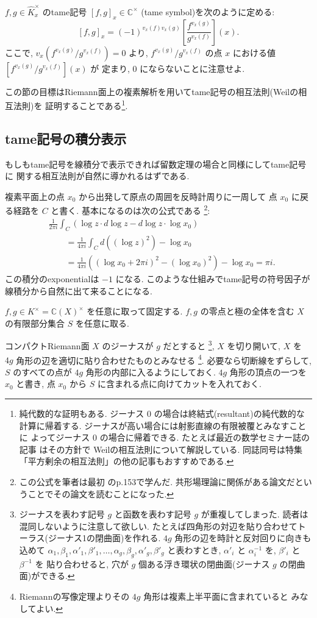 \documentclass[12pt,twoside]{jarticle}
\newcommand\C{{\mathbb C}} %
\theoremstyle{definition} %
\theoremstyle{definition} %
\theoremstyle{definition} %
\numberwithin{theorem}{section}
\numberwithin{equation}{section}
\numberwithin{figure}{section}
\numberwithin{table}{section}
\newcommand\Khat{{\widehat K}}
\newcommand\tame[3]{\left[#2,#3\right]_{#1}}
\begin{document}
$f,g\in\Khat_x^\times$ のtame記号 $\tame{x}{f}{g}\in\C^\times$ 
(tame symbol)を次のように定める:
\[
\tame{x}{f}{g} =
(-1)^{v_x(f)v_x(g)}\left[\frac{f^{v_x(g)}}{g^{v_x(f)}}\right](x).
\]
ここで, $v_x(f^{v_x(g)}/g^{v_x(f)})=0$ より, 
$f^{v_x(g)}/g^{v_x(f)}$ の点 $x$ における値 $[f^{v_x(g)}/g^{v_x(f)}](x)$ が
定まり, $0$ にならないことに注意せよ.

この節の目標はRiemann面上の複素解析を用いてtame記号の相互法則(Weilの相互法則)を
証明することである\footnote{純代数的な証明もある.
ジーナス $0$ の場合は終結式(resultant)の純代数的な計算に帰着する.
ジーナスが高い場合には射影直線の有限被覆とみなすことに
よってジーナス $0$ の場合に帰着できる. 
たとえば最近の数学セミナー誌の記事 \cite{yamazaki} はその方針で
Weilの相互法則について解説している.
同誌同号は特集「平方剰余の相互法則」の他の記事もおすすめである.
}.


\subsection{tame記号の積分表示}
\label{sec:tame-integral}

もしもtame記号を線積分で表示できれば留数定理の場合と同様にしてtame記号に
関する相互法則が自然に導かれるはずである. 

複素平面上の点 $x_0$ から出発して原点の周囲を反時計周りに一周して
点 $x_0$ に戻る経路を $C$ と書く.
基本になるのは次の公式である%
\footnote{この公式を筆者は最初 \cite{deligne} のp.153で学んだ.
共形場理論に関係がある論文だということでその論文を読むことになった.}:
\begin{align*}
&
\frac{1}{2\pi i}\int_C (\log z\cdot d\log z - d\log z\cdot\log x_0)
\\ & \qquad
= \frac{1}{4\pi i}\int_C d\left((\log z)^2\right) 
- \log x_0
\\ & \qquad
= \frac{1}{4\pi i}\left((\log x_0 + 2\pi i)^2 - (\log x_0)^2 \right) 
- \log x_0
= \pi i.
\end{align*}
この積分のexponentialは $-1$ になる. 
このような仕組みでtame記号の符号因子が線積分から自然に出て来ることになる.

$f,g\in K^\times=\C(X)^\times$ を任意に取って固定する.
$f,g$ の零点と極の全体を含む $X$ の有限部分集合 $S$ を任意に取る. 

コンパクトRiemann面 $X$ のジーナスが $g$ だとすると%
\footnote{ジーナスを表わす記号 $g$ と函数を表わす記号 $g$ が重複してしまった.
読者は混同しないように注意して欲しい.
たとえば四角形の対辺を貼り合わせてトーラス(ジーナス1の閉曲面)を作れる.
$4g$ 角形の辺を時計と反対回りに向きも込めて 
$\alpha_1,\beta_1,\alpha'_1,\beta'_1,\ldots,\alpha_g,\beta_g,\alpha'_g,\beta'_g$
と表わすとき, $\alpha'_i$ と $\alpha_i^{-1}$ を, $\beta'_i$ と $\beta^{-1}$ を
貼り合わせると, 穴が $g$ 個ある浮き環状の閉曲面(ジーナス $g$ の閉曲面)ができる.
},
$X$ を切り開いて, $X$ を $4g$ 角形の辺を適切に貼り合わせたものとみなせる%
\footnote{Riemannの写像定理よりその $4g$ 角形は複素上半平面に含まれていると
みなしてよい.}.
必要なら切断線をずらして, 
$S$ のすべての点が $4g$ 角形の内部に入るようにしておく.
$4g$ 角形の頂点の一つを $x_0$ と書き, 
点 $x_0$ から $S$ に含まれる点に向けてカットを入れておく.
\end{document}
